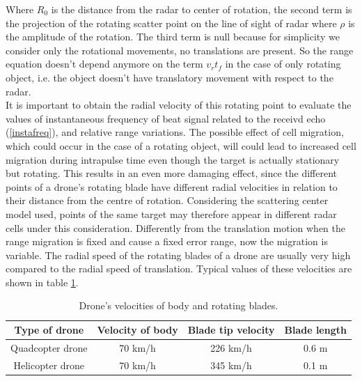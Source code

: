 Where $R_{0}$ is the distance from the radar to center of rotation, the second term is the projection of the rotating scatter point on the line of sight of radar where $\rho$ is the amplitude of the rotation. The third term is null because for simplicity we consider only the rotational movements, no translations are present. So the range equation doesn't depend anymore on the term $v_{r}t_{f}$ in the case of only rotating object, i.e. the object doesn't have translatory movement with respect to the radar.\\
It is important to obtain the radial velocity of this rotating point to evaluate the values of instantaneous frequency of beat signal related to the receivd echo (\ref{instafreq}), and relative range variations. The possible effect of cell migration, which could occur in the case of a rotating object, will could lead to increased cell migration during intrapulse time even though the target is actually stationary but rotating. This results in an even more damaging effect, since the different points of a drone's rotating blade have different radial velocities in relation to their distance from the centre of rotation. Considering the scattering center model used, points of the same target may therefore appear in different radar cells under this consideration. Differently from the translation motion when the range migration is fixed and cause a fixed error range, now the migration is variable.
The radial speed of the rotating blades of a drone are usually very high compared to the radial speed of translation. Typical values of these velocities are shown in table \ref{vel_table}.

\begin{table}[h!]
\centering
\begin{tabular}{|c|c|c|c|}
\hline
\textbf{Type of drone} & \textbf{Velocity of body} & \textbf{Blade tip velocity} & \multicolumn{1}{l|}{\textbf{Blade length}} \\ \hline
Quadcopter drone       & 70 km/h                   & 226 km/h                    & 0.6 m                                      \\ \hline
Helicopter drone       & 70 km/h                   & 345 km/h                    & 0.1 m                                      \\ \hline
\end{tabular}
\caption{Drone's velocities of body and rotating blades. \cite{tesiligresti}}
\label{vel_table}
\end{table}

